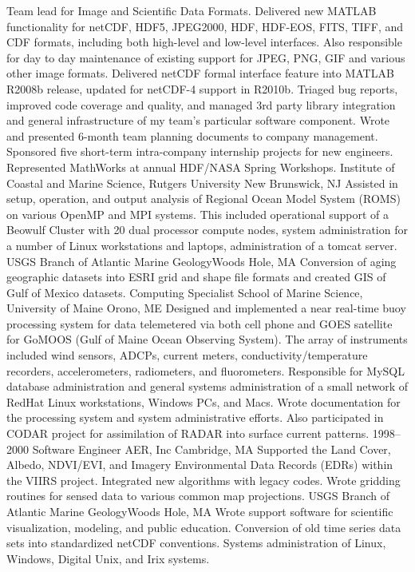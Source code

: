 \documentclass[11pt]{moderncv}  %
\begin{document}
{   
Team lead for Image and Scientific Data Formats.  Delivered new MATLAB functionality for netCDF, HDF5, JPEG2000, HDF, HDF-EOS, FITS, TIFF, and CDF formats, including both high-level and low-level interfaces.  Also responsible for day to day maintenance of existing support for JPEG, PNG, GIF and various other image formats.  Delivered netCDF formal interface feature into MATLAB R2008b release, updated for netCDF-4 support in R2010b. Triaged bug reports, improved code coverage and quality, and managed 3rd party library integration and general infrastructure of my team's particular software component.  Wrote and presented 6-month team planning documents to company management.  Sponsored five short-term intra-company internship projects for new engineers.  Represented MathWorks at annual HDF/NASA Spring Workshops.
}
{
	Institute of Coastal and Marine Science, Rutgers University}
    {New Brunswick, NJ}{} {
Assisted in setup,  operation, and output analysis  of Regional Ocean Model System (ROMS) on various OpenMP and MPI systems.  This included operational support of a Beowulf Cluster with 20 dual processor compute nodes, system administration for a number of Linux workstations and laptops, administration of a tomcat server.
}
{
	USGS Branch of Atlantic Marine Geology}{Woods Hole, MA}{}{
    Conversion of aging geographic datasets into ESRI grid and shape
    file formats and created GIS of Gulf of Mexico datasets.
}
{Computing Specialist}
{School of Marine Science, University of Maine}
{Orono, ME}{}
{
    Designed and implemented a near real-time buoy processing system
    for data telemetered via both cell phone and GOES satellite for
    GoMOOS (Gulf of Maine Ocean Observing System).   The array of
    instruments included wind sensors, ADCPs, current meters,
    conductivity/temperature recorders, accelerometers, radiometers,
    and fluorometers.   Responsible for MySQL database administration
    and general systems administration of a small network of RedHat
    Linux workstations, Windows PCs, and Macs.   Wrote documentation
    for the processing system and system administrative efforts.
    Also participated in CODAR project for assimilation of RADAR
    into surface current patterns.
}
\cventry
{1998--2000}
{Software Engineer}
{AER, Inc}
{Cambridge, MA}
{}
{
    Supported the Land Cover, Albedo, NDVI/EVI, and Imagery
    Environmental Data Records (EDRs) within the VIIRS project.
    Integrated new algorithms with legacy codes. Wrote gridding
    routines for sensed data to various common map projections.
}
    {USGS Branch of Atlantic Marine Geology}{Woods Hole, MA}{}{
    Wrote support software for scientific visualization, modeling,
    and public education. Conversion of old time series data sets
    into standardized netCDF conventions.  Systems administration
    of Linux, Windows, Digital Unix, and Irix systems.}
\end{document}
